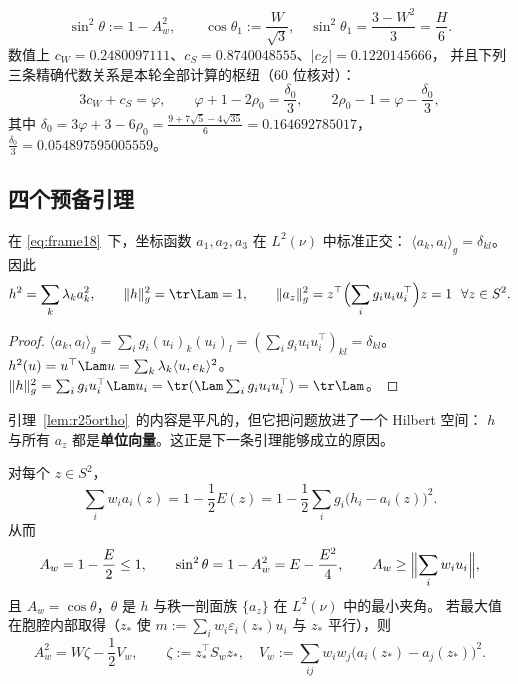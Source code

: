 \begin{equation}\label{eq:r25ang}
\sin^2\theta:=1-A_w^2,\qquad
\cos\theta_1:=\frac{W}{\sqrt3},\quad \sin^2\theta_1=\frac{3-W^2}3=\frac H6 .
\end{equation}
数值上 $c_W=0.2480097111$、$c_S=0.8740048555$、$|c_Z|=0.1220145666$，
并且下列三条精确代数关系是本轮全部计算的枢纽（$60$ 位核对）：
\begin{equation}\label{eq:r25alg}
3c_W+c_S=\varphi,\qquad
\varphi+1-2\rho_0=\frac{\delta_0}3,\qquad
2\rho_0-1=\varphi-\frac{\delta_0}3 ,
\end{equation}
其中 $\delta_0=3\varphi+3-6\rho_0=\frac{9+7\sqrt5-4\sqrt{35}}6=0.164692785017$，
$\frac{\delta_0}3=0.054897595005559$。

\subsection{四个预备引理}\label{sec:r25:lem}

\begin{lemma}[正交坐标基]\label{lem:r25ortho}
在 \eqref{eq:frame18}~下，坐标函数 $a_1,a_2,a_3$ 在 $L^2(\nu)$ 中标准正交：
$\langle a_k,a_l\rangle_g=\delta_{kl}$。因此
\begin{equation}\label{eq:r25ortho1}
h^2=\sum_k\lambda_ka_k^2,\qquad \|h\|_g^2=\tr\Lam=1,\qquad
\|a_z\|_g^2=z^\top\Bigl(\sum_ig_iu_iu_i^\top\Bigr)z=1\ \ \forall z\in S^2 .
\end{equation}
\end{lemma}

\begin{proof}
$\langle a_k,a_l\rangle_g=\sum_ig_i(u_i)_k(u_i)_l=(\sum_ig_iu_iu_i^\top)_{kl}=\delta_{kl}$。
$h^2(u)=u^\top\Lam u=\sum_k\lambda_k\langle u,e_k\rangle^2$。
$\|h\|_g^2=\sum_ig_iu_i^\top\Lam u_i=\tr(\Lam\sum_ig_iu_iu_i^\top)=\tr\Lam$。
\end{proof}

引理~\ref{lem:r25ortho}~的内容是平凡的，但它把问题放进了一个 Hilbert 空间：
$h$ 与所有 $a_z$ 都是\textbf{单位向量}。这正是下一条引理能够成立的原因。

\begin{lemma}\label{lem:r25dipole}
对每个 $z\in S^2$，
\begin{equation}\label{eq:r25dip1}
\sum_iw_ia_i(z)=1-\frac12E(z)=1-\frac12\sum_ig_i\bigl(h_i-a_i(z)\bigr)^2 .
\end{equation}
从而
\begin{equation}\label{eq:r25dip2}
A_w=1-\frac E2\le1,\qquad
\sin^2\theta=1-A_w^2=E-\frac{E^2}4,\qquad
A_w\ge\Bigl\|\sum_iw_iu_i\Bigr\| ,
\end{equation}
且 $A_w=\cos\theta$，$\theta$ 是 $h$ 与秩一剖面族 $\{a_z\}$ 在 $L^2(\nu)$ 中的最小夹角。
若最大值在胞腔内部取得（$z_*$ 使 $m:=\sum_iw_i\varepsilon_i(z_*)u_i$ 与 $z_*$ 平行），则
\begin{equation}\label{eq:r25dip3}
A_w^2=W\zeta-\frac12V_w,\qquad
\zeta:=z_*^\top S_wz_*,\quad V_w:=\sum_{ij}w_iw_j\bigl(a_i(z_*)-a_j(z_*)\bigr)^2 .
\end{equation}
\end{lemma}

